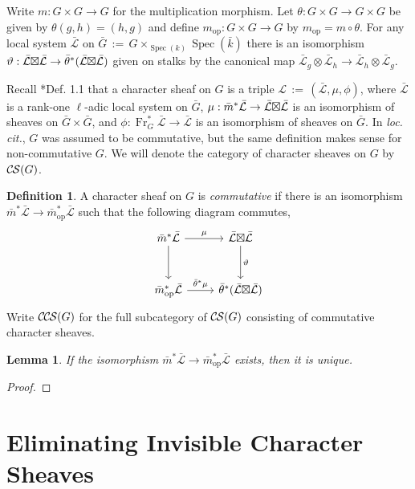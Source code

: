 \documentclass[10pt]{amsart}
\theoremstyle{plain}
\newtheorem{lemma}[theorem]{Lemma}
\theoremstyle{definition}
\newtheorem{definition}[theorem]{Definition}
\newcommand{\bFq}{\bar{k}}
\newcommand{\Fq}{k}
\newcommand{\Frob}[1]{\operatorname{Fr}_{#1}}
\newcommand{\Spec}[1]{{\operatorname{Spec}(#1)}}
\newcommand{\op}{_{\operatorname{op}}}
\newcommand{\ceq}{{\, :=\, }}
\newcommand{\cs}[1]{{\mathcal{#1}}}
\newcommand{\gcs}[1]{{\mathcal{\bar #1}}}
\newcommand{\CS}{{\mathcal{C\hskip-0.8pt S}}}
\newcommand{\CCS}{{\mathcal{C\hskip-.8pt C\hskip-0.8pt S}}}
\newcommand{\bm}{\bar{m}}
\newcommand{\bG}{\bar{G}}
\newcommand{\tight}[3]{\hspace{-#1pt}{#2}\hspace{-#3pt}}
\newcommand{\LxL}{\text{$\gcs{L} \tight{0}{\boxtimes}{0} \gcs{L}$}}
\begin{document}
Write $m : G \times G \to G$ for the multiplication morphism.
Let $\theta : G\times G \to G\times G$ be given by $\theta(g,h) = (h,g)$
and define $m\op : G \times G \to G$ by $m\op = m \circ \theta$.
For any local system $\gcs{L}$ on $\bG \ceq G \times_{\Spec{\Fq}} \Spec{\bFq}$ there is an isomorphism
$\vartheta : \LxL \to {\bar \theta}^*(\LxL)$ given on stalks by the canonical map
$\gcs{L}_{g} \otimes \gcs{L}_{h} \to \gcs{L}_{h} \otimes \gcs{L}_{g}$.

Recall \cite{cunningham-roe:13a}*{Def. 1.1} that a character sheaf on $G$ is a triple $\cs{L} \ceq (\gcs{L}, \mu, \phi)$,
where $\gcs{L}$ is a rank-one $\ell$-adic local system on $\bG$, $\mu : \bm^* \gcs{L} \to \LxL$ is an isomorphism
of sheaves on $\bG \times \bG$, and $\phi : \Frob{G}^* \gcs{L} \to \gcs{L}$ is an isomorphism of sheaves on $\bG$.
In \emph{loc. cit.}, $G$ was assumed to be commutative, but the same definition makes sense for non-commutative $G$.
We will denote the category of character sheaves on $G$ by $\CS(G)$.

\begin{definition}\label{def:CCS}
A character sheaf on $G$ is \emph{commutative} if there is an isomorphism ${\bar m}^* \gcs{L} \to {\bar m}\op^* \gcs{L}$
such that the following diagram commutes,
  \[
  \begin{tikzcd}[row sep=30]
   \bm^*\gcs{L} \arrow{d} \arrow{r}{\mu} & \LxL \arrow{d}{\vartheta}\\
   \bm\op^*\gcs{L} \arrow{r}{{\bar \theta}^*\mu} &  {\bar \theta}^*(\LxL)
  \end{tikzcd}
  \]
 Write $\CCS(G)$ for the full subcategory of $\CS(G)$ consisting of commutative character sheaves.
 \end{definition}
 

\begin{lemma}
If the isomorphism ${\bar m}^* \gcs{L} \to {\bar m}\op^* \gcs{L}$ exists, then it is unique.
\end{lemma}
\begin{proof}
\end{proof}

\section{Eliminating Invisible Character Sheaves}\label{sec:defect}
\end{document}
